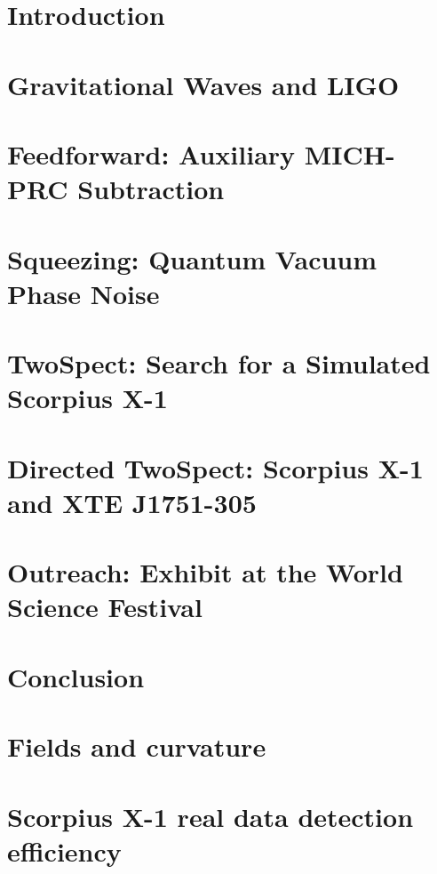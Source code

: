 \documentclass[leqno,twoside]{report}
\theoremstyle{plain}
\theoremstyle{definition}
\theoremstyle{remark}
\numberwithin{theorem}{chapter}        %
\begin{document}
\chapter{Introduction}
\label{intro} 

\chapter{Gravitational Waves and LIGO}
\label{chap2}

\chapter{Feedforward: Auxiliary MICH-PRC Subtraction}
\label{chap3}

\chapter{Squeezing: Quantum Vacuum Phase Noise}
\label{chap4}

\chapter{TwoSpect: Search for a Simulated Scorpius X-1}
\label{chap5}

\chapter{Directed TwoSpect: Scorpius X-1 and XTE J1751-305}
\label{chap6}

\chapter{Outreach: Exhibit at the World Science Festival}
\label{chap7}

\chapter{Conclusion}
\label{conclusion}



\startappendices
\chapter{Fields and curvature}
\label{appendix}

\chapter{Scorpius X-1 real data detection efficiency}
\label{appendix2}

\end{document}
